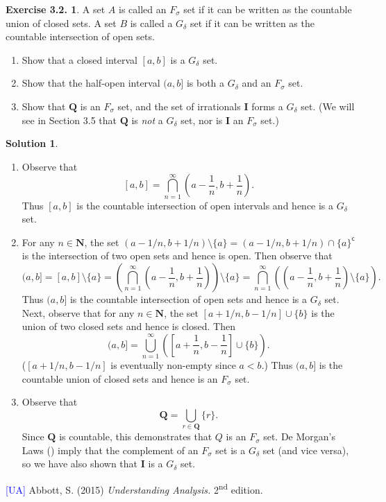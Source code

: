 \documentclass[12pt]{article}
\theoremstyle{definition}
\theoremstyle{exercise}
\newtheorem{exercise}{Exercise 3.2.}
\theoremstyle{solution}
\newtheorem*{solution}{Solution}
\newcommand{\ts}{\textsuperscript}
\newcommand{\setcomp}[1]{#1^{\mathsf{c}}}
\newcommand{\N}{\mathbf{N}}
\newcommand{\Q}{\mathbf{Q}}
\newcommand{\I}{\mathbf{I}}
\begin{document}
\begin{exercise}
\label{ex:15}
    A set \( A \) is called an \( F_{\sigma} \) set if it can be written as the countable union of closed sets. A set \( B \) is called a \( G_{\delta} \) set if it can be written as the countable intersection of open sets.
    \begin{enumerate}
        \item Show that a closed interval \( [a, b] \) is a \( G_{\delta} \) set.

        \item Show that the half-open interval \( (a, b] \) is both a \( G_{\delta} \) and an \( F_{\sigma} \) set.

        \item Show that \( \Q \) is an \( F_{\sigma} \) set, and the set of irrationals \( \I \) forms a \( G_{\delta} \) set. (We will see in Section 3.5 that \( \Q \) is \textit{not} a \( G_{\delta} \) set, nor is \( \I \) an \( F_{\sigma} \) set.)
    \end{enumerate}
\end{exercise}

\begin{solution}
    \begin{enumerate}
        \item Observe that
        \[
            [a, b] = \bigcap_{n=1}^{\infty} \left( a - \frac{1}{n}, b + \frac{1}{n} \right).
        \]
        Thus \( [a, b] \) is the countable intersection of open intervals and hence is a \( G_{\delta} \) set.

        \item For any \( n \in \N \), the set \( (a - 1/n, b + 1/n) \setminus \{ a \} = (a - 1/n, b + 1/n) \cap \setcomp{\{ a \}} \) is the intersection of two open sets and hence is open. Then observe that
        \[
            (a, b] = [a, b] \setminus \{ a \} = \left( \bigcap_{n=1}^{\infty} \left( a - \frac{1}{n}, b + \frac{1}{n} \right) \right) \setminus \{ a \} = \bigcap_{n=1}^{\infty} \left( \left( a - \frac{1}{n}, b + \frac{1}{n} \right) \setminus \{ a \} \right).
        \]
        Thus \( (a, b] \) is the countable intersection of open sets and hence is a \( G_{\delta} \) set. Next, observe that for any \( n \in \N \), the set \( [a + 1/n, b - 1/n] \cup \{ b \} \) is the union of two closed sets and hence is closed. Then
        \[
            (a, b] = \bigcup_{n=1}^{\infty} \left( \left[ a + \frac{1}{n}, b - \frac{1}{n} \right] \cup \{ b \} \right).
        \]
        (\( [a + 1/n, b - 1/n] \) is eventually non-empty since \( a < b \).) Thus \( (a, b] \) is the countable union of closed sets and hence is an \( F_{\sigma} \) set.

        \item Observe that
        \[
            \Q = \bigcup_{r \in \Q} \{ r \}.
        \]
        Since \( \Q \) is countable, this demonstrates that \( Q \) is an \( F_{\sigma} \) set. De Morgan's Laws () imply that the complement of an \( F_{\sigma} \) set is a \( G_{\delta} \) set (and vice versa), so we have also shown that \( \I \) is a \( G_{\delta} \) set.
    \end{enumerate}
\end{solution}

\noindent \hrulefill

\noindent \hypertarget{ua}{\textcolor{blue}{[UA]} Abbott, S. (2015) \textit{Understanding Analysis.} 2\ts{nd} edition.}
\end{document}
